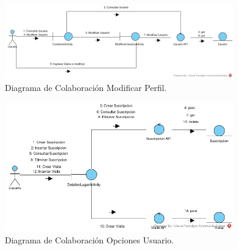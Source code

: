 \documentclass[12pt,letterpaper,openany]{book}
\begin{document}
\begin{figure}[H]
\begin{center}
\includegraphics[width=10cm]{./imagenes/DC/DC_modificar_perfil}
\caption{Diagrama de Colaboración Modificar Perfil.}
\end{center}
\end{figure}

\begin{figure}[H]
\begin{center}
\includegraphics[width=10cm]{./imagenes/DC/DC_opciones_usuario}
\caption{Diagrama de Colaboración Opciones Usuario.}
\end{center}
\end{figure}



\end{document}
